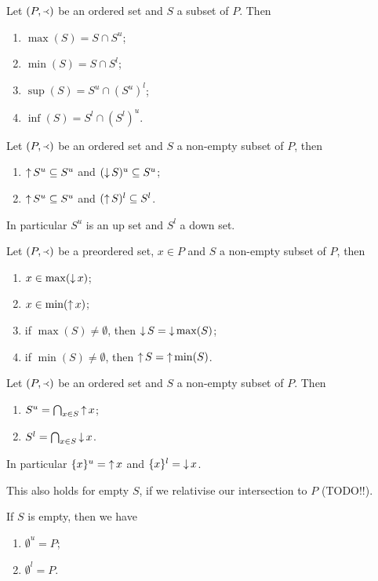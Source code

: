 \begin{lemma}
Let $(P,\Yleft)$ be an ordered set and $S$ a subset of $P$. Then
\begin{enumerate}
\item $\max(S) = S\cap S^u$;
\item $\min(S) = S\cap S^l$;
\item $\sup(S) = S^u\cap (S^u)^l$;
\item $\inf(S) = S^l\cap (S^l)^u$.
\end{enumerate}
\end{lemma}


\begin{lemma} \label{upperBoundUpsetlowerBoundDownset}
Let $(P,\Yleft)$ be an ordered set and $S$ a non-empty subset of $P$, then
\begin{enumerate}
\item $\mathop{\uparrow} S^u \subseteq S^u$ and $(\mathop{\downarrow} S)^u \subseteq S^u$;
\item $\mathop{\uparrow} S^u \subseteq S^u$ and $(\mathop{\uparrow} S)^l \subseteq S^l$.
\end{enumerate}
\end{lemma}
In particular $S^u$ is an up set and $S^l$ a down set.
\begin{corollary} \label{minMaxUpsetDownset}
Let $(P,\Yleft)$ be a preordered set, $x\in P$ and $S$ a non-empty subset of $P$, then
\begin{enumerate}
\item $x \in \max(\mathop{\downarrow} x)$;
\item $x \in \min(\mathop{\uparrow} x)$;
\item if $\max(S)\neq \emptyset$, then $\mathop{\downarrow} S = \mathop{\downarrow} \max(S)$;
\item if $\min(S)\neq \emptyset$, then $\mathop{\uparrow} S = \mathop{\uparrow} \min(S)$.
\end{enumerate}
\end{corollary}

\begin{lemma} \label{boundsFromUpDownSets}
Let $(P,\Yleft)$ be an ordered set and $S$ a non-empty subset of $P$. Then
\begin{enumerate}
\item $S^u = \bigcap_{x\in S}\mathop{\uparrow} x$;
\item $S^l = \bigcap_{x\in S}\mathop{\downarrow} x$.
\end{enumerate}
In particular $\{x\}^u = \mathop{\uparrow} x$ and $\{x\}^l = \mathop{\downarrow} x$.

This also holds for empty $S$, if we relativise our intersection to $P$ (TODO!!).

If $S$ is empty, then we have
\begin{enumerate}
\item $\emptyset^u = P$;
\item $\emptyset^l = P$.
\end{enumerate}
\end{lemma}

